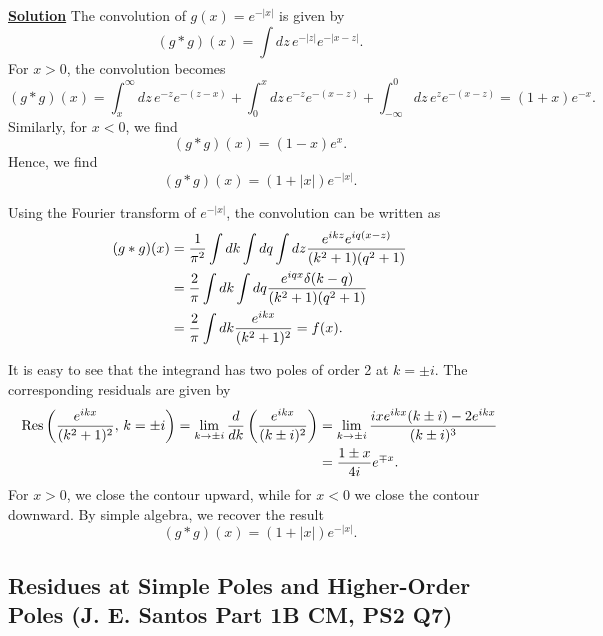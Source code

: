 \noindent\underline{\textbf{Solution}} The convolution of $g(x) = e^{-|x|}$ is given by 
\begin{equation}
    (g*g)(x) = \int dz\,e^{-|z|}e^{-|x-z|}.
\end{equation}
For $x>0$, the convolution becomes
\begin{equation}
     (g*g)(x) = \int^\infty_xdz\,e^{-z}e^{-(z-x)} + \int^x_0dz\,e^{-z}e^{-(x-z)} + \int^0_{-\infty}dz\,e^ze^{-(x-z)} = (1+x)e^{-x}.
\end{equation}
Similarly, for $x<0$, we find
\begin{equation}
    (g*g)(x) = (1-x)e^x.
\end{equation}
Hence, we find
\begin{equation}
    (g*g)(x) = (1+|x|)e^{-|x|}.
\end{equation}

Using the Fourier transform of $e^{-|x|}$, the convolution can be written as
\begin{align}
    (g*g)(x) &= \frac{1}{\pi^2}\int dk\int dq \int dz\frac{e^{ikz}e^{iq(x-z)}}{(k^2+1)(q^2+1)} \notag\\
    &= \frac{2}{\pi}\int dk\int dq\frac{e^{iqx}\delta(k-q)}{(k^2+1)(q^2+1)} \notag\\
    &=\frac{2}{\pi}\int dk\frac{e^{ikx}}{(k^2+1)^2} =f(x).
\end{align}

It is easy to see that the integrand has two poles of order 2 at $k=\pm i$. The corresponding residuals are given by
\begin{align}
    \operatorname{Res}\left(\frac{e^{ikx}}{(k^2+1)^2}, \,k=\pm i\right) = \lim_{k\to \pm i}\frac{d}{dk}\left(\frac{e^{ikx}}{(k\pm i)^2}\right) &= \lim_{k\to \pm i}\frac{ixe^{ikx}(k\pm i) - 2e^{ikx}}{(k \pm i)^3} \notag\\&=\frac{1 \pm x}{4i}e^{\mp x}.
\end{align}
For $x>0$, we close the contour upward, while for $x<0$ we close the contour downward. By simple algebra, we recover the result
\begin{equation}
    (g*g)(x) = (1+|x|)e^{-|x|}.
\end{equation}

\subsection{Residues at Simple Poles and Higher-Order Poles (J. E. Santos Part 1B CM, PS2 Q7)}
\label{sec:residues}

